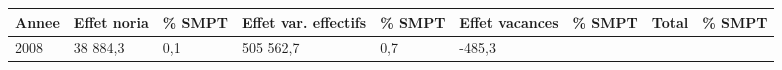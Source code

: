 \begin{longtable}[]{@{}lllllllll@{}}
\toprule
\begin{minipage}[b]{0.05\columnwidth}\raggedright
Annee\strut
\end{minipage} & \begin{minipage}[b]{0.10\columnwidth}\raggedright
Effet noria\strut
\end{minipage} & \begin{minipage}[b]{0.06\columnwidth}\raggedright
\% SMPT\strut
\end{minipage} & \begin{minipage}[b]{0.16\columnwidth}\raggedright
Effet var. effectifs\strut
\end{minipage} & \begin{minipage}[b]{0.06\columnwidth}\raggedright
\% SMPT\strut
\end{minipage} & \begin{minipage}[b]{0.12\columnwidth}\raggedright
Effet vacances\strut
\end{minipage} & \begin{minipage}[b]{0.06\columnwidth}\raggedright
\% SMPT\strut
\end{minipage} & \begin{minipage}[b]{0.10\columnwidth}\raggedright
Total\strut
\end{minipage} & \begin{minipage}[b]{0.06\columnwidth}\raggedright
\% SMPT\strut
\end{minipage}\tabularnewline
\midrule
\endhead
\begin{minipage}[t]{0.05\columnwidth}\raggedright
2008\strut
\end{minipage} & \begin{minipage}[t]{0.10\columnwidth}\raggedright
38 884,3\strut
\end{minipage} & \begin{minipage}[t]{0.06\columnwidth}\raggedright
0,1\strut
\end{minipage} & \begin{minipage}[t]{0.16\columnwidth}\raggedright
505 562,7\strut
\end{minipage} & \begin{minipage}[t]{0.06\columnwidth}\raggedright
0,7\strut
\end{minipage} & \begin{minipage}[t]{0.12\columnwidth}\raggedright
-485,3\strut
\end{minipage} & \begin{minipage}[t]{0.06\columnwidth}\raggedright

\end{minipage}
\end{longtable}
